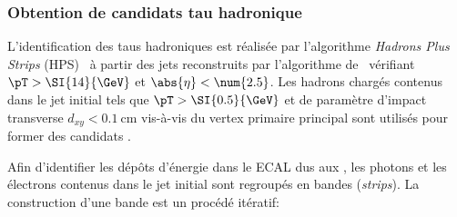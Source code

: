 \subsubsection{Obtention de candidats tau hadronique}
L'identification des taus hadroniques est réalisée par l'algorithme \emph{Hadrons Plus Strips} (HPS)~\cite{Khachatryan:2015dfa,Sirunyan:2018pgf} à partir des jets reconstruits par l'algorithme de \PF\ vérifiant $\pT>\SI{14}{\GeV}$ et $\abs{\eta}<\num{2.5}$.
Les hadrons chargés contenus dans le jet initial tels que $\pT>\SI{0.5}{\GeV}$ et de paramètre d'impact transverse $d_{xy}<\SI{0.1}{\centi\meter}$ vis-à-vis du vertex primaire principal sont utilisés pour former des candidats \tauh.
\par
Afin d'identifier les dépôts d'énergie dans le ECAL dus aux \pionnull, les photons et les électrons contenus dans le jet initial sont regroupés en bandes (\emph{strips}).
La construction d'une bande est un procédé itératif:
